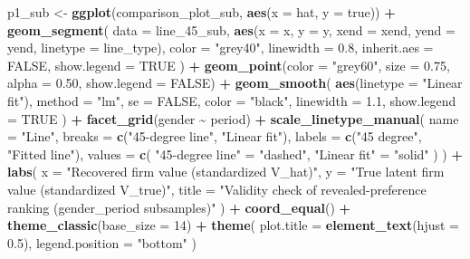 \documentclass[
]{article}
\newenvironment{Shaded}{\begin{snugshade}}{\end{snugshade}}
\newcommand{\AttributeTok}[1]{\textcolor[rgb]{0.13,0.29,0.53}{#1}}
\newcommand{\ConstantTok}[1]{\textcolor[rgb]{0.56,0.35,0.01}{#1}}
\newcommand{\DecValTok}[1]{\textcolor[rgb]{0.00,0.00,0.81}{#1}}
\newcommand{\FloatTok}[1]{\textcolor[rgb]{0.00,0.00,0.81}{#1}}
\newcommand{\FunctionTok}[1]{\textcolor[rgb]{0.13,0.29,0.53}{\textbf{#1}}}
\newcommand{\NormalTok}[1]{#1}
\newcommand{\OtherTok}[1]{\textcolor[rgb]{0.56,0.35,0.01}{#1}}
\newcommand{\SpecialCharTok}[1]{\textcolor[rgb]{0.81,0.36,0.00}{\textbf{#1}}}
\newcommand{\StringTok}[1]{\textcolor[rgb]{0.31,0.60,0.02}{#1}}
\begin{document}
\begin{Shaded}
\begin{Highlighting}[]
\NormalTok{p1\_sub }\OtherTok{\textless{}{-}} \FunctionTok{ggplot}\NormalTok{(comparison\_plot\_sub, }\FunctionTok{aes}\NormalTok{(}\AttributeTok{x =}\NormalTok{ hat, }\AttributeTok{y =}\NormalTok{ true)) }\SpecialCharTok{+}
    \FunctionTok{geom\_segment}\NormalTok{(}
        \AttributeTok{data =}\NormalTok{ line\_45\_sub,}
        \FunctionTok{aes}\NormalTok{(}\AttributeTok{x =}\NormalTok{ x, }\AttributeTok{y =}\NormalTok{ y, }\AttributeTok{xend =}\NormalTok{ xend, }\AttributeTok{yend =}\NormalTok{ yend, }\AttributeTok{linetype =}\NormalTok{ line\_type),}
        \AttributeTok{color =} \StringTok{"grey40"}\NormalTok{,}
        \AttributeTok{linewidth =} \FloatTok{0.8}\NormalTok{,}
        \AttributeTok{inherit.aes =} \ConstantTok{FALSE}\NormalTok{,}
        \AttributeTok{show.legend =} \ConstantTok{TRUE}
\NormalTok{    ) }\SpecialCharTok{+}
    \FunctionTok{geom\_point}\NormalTok{(}\AttributeTok{color =} \StringTok{"grey60"}\NormalTok{, }\AttributeTok{size =} \FloatTok{0.75}\NormalTok{, }\AttributeTok{alpha =} \FloatTok{0.50}\NormalTok{, }\AttributeTok{show.legend =} \ConstantTok{FALSE}\NormalTok{) }\SpecialCharTok{+}
    \FunctionTok{geom\_smooth}\NormalTok{(}
        \FunctionTok{aes}\NormalTok{(}\AttributeTok{linetype =} \StringTok{"Linear fit"}\NormalTok{),}
        \AttributeTok{method =} \StringTok{"lm"}\NormalTok{,}
        \AttributeTok{se =} \ConstantTok{FALSE}\NormalTok{,}
        \AttributeTok{color =} \StringTok{"black"}\NormalTok{,}
        \AttributeTok{linewidth =} \FloatTok{1.1}\NormalTok{,}
        \AttributeTok{show.legend =} \ConstantTok{TRUE}
\NormalTok{    ) }\SpecialCharTok{+}
    \FunctionTok{facet\_grid}\NormalTok{(gender }\SpecialCharTok{\textasciitilde{}}\NormalTok{ period) }\SpecialCharTok{+}
    \FunctionTok{scale\_linetype\_manual}\NormalTok{(}
        \AttributeTok{name =} \StringTok{"Line"}\NormalTok{,}
        \AttributeTok{breaks =} \FunctionTok{c}\NormalTok{(}\StringTok{"45{-}degree line"}\NormalTok{, }\StringTok{"Linear fit"}\NormalTok{),}
        \AttributeTok{labels =} \FunctionTok{c}\NormalTok{(}\StringTok{"45 degree"}\NormalTok{, }\StringTok{"Fitted line"}\NormalTok{),}
        \AttributeTok{values =} \FunctionTok{c}\NormalTok{(}
            \StringTok{"45{-}degree line"} \OtherTok{=} \StringTok{"dashed"}\NormalTok{,}
            \StringTok{"Linear fit"} \OtherTok{=} \StringTok{"solid"}
\NormalTok{        )}
\NormalTok{    ) }\SpecialCharTok{+}
    \FunctionTok{labs}\NormalTok{(}
        \AttributeTok{x =} \StringTok{"Recovered firm value (standardized V\_hat)"}\NormalTok{,}
        \AttributeTok{y =} \StringTok{"True latent firm value (standardized V\_true)"}\NormalTok{,}
        \AttributeTok{title =} \StringTok{"Validity check of revealed{-}preference ranking (gender\_period subsamples)"}
\NormalTok{    ) }\SpecialCharTok{+}
    \FunctionTok{coord\_equal}\NormalTok{() }\SpecialCharTok{+}
    \FunctionTok{theme\_classic}\NormalTok{(}\AttributeTok{base\_size =} \DecValTok{14}\NormalTok{) }\SpecialCharTok{+}
    \FunctionTok{theme}\NormalTok{(}
        \AttributeTok{plot.title =} \FunctionTok{element\_text}\NormalTok{(}\AttributeTok{hjust =} \FloatTok{0.5}\NormalTok{),}
        \AttributeTok{legend.position =} \StringTok{"bottom"}
\NormalTok{    )}


\end{Highlighting}
\end{Shaded}
\end{document}
